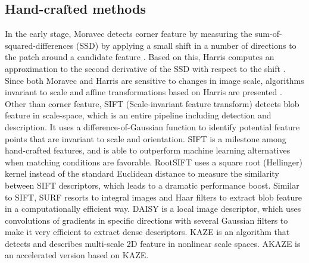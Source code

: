 \subsection{Hand-crafted methods}
In the early stage, Moravec detects corner feature by measuring the sum-of-squared-differences (SSD) by applying a small shift in a number of directions to the patch around a candidate feature \cite{moravec1980obstacle}. Based on this, Harris computes an approximation to the second derivative of the SSD with respect to the shift \cite{harris1988combined}. Since both Moravec and Harris are sensitive to changes in image scale, algorithms invariant to scale and affine transformations based on Harris are presented \cite{mikolajczyk2004scale}. Other than corner feature, SIFT (Scale-invariant feature transform) \cite{lowe2004distinctive} detects blob feature in scale-space, which is an entire pipeline including detection and description. It uses a difference-of-Gaussian function to identify potential feature points that are invariant to scale and orientation. SIFT is a milestone among hand-crafted features, and is able to outperform machine learning alternatives when matching conditions are favorable. RootSIFT \cite{arandjelovic2012three} uses a square root (Hellinger) kernel instead of the standard Euclidean distance to measure the similarity between SIFT descriptors, which leads to a dramatic performance boost. Similar to SIFT, SURF \cite{bay2006surf} resorts to integral images and Haar filters to extract blob feature in a computationally efficient way. DAISY \cite{tola2009daisy} is a local image descriptor, which uses convolutions of gradients in specific directions with several Gaussian filters to make it very efficient to extract dense descriptors. KAZE \cite{alcantarilla2012kaze} is an algorithm that detects and describes multi-scale 2D feature in nonlinear scale spaces. AKAZE \cite{Alcantarilla13bmvc} is an accelerated version based on KAZE.
